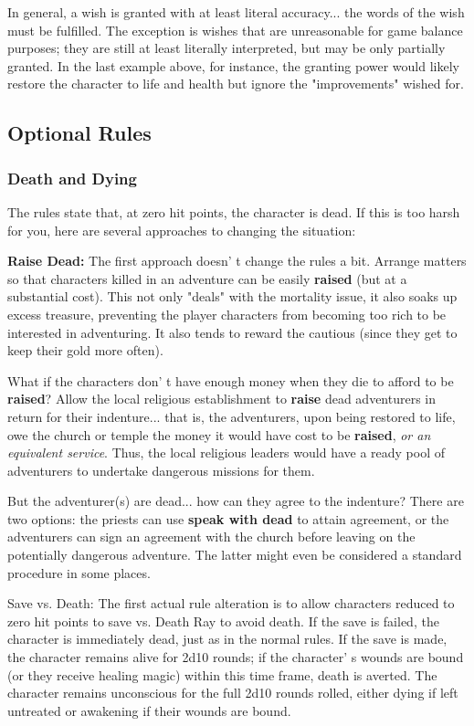 \documentclass[a4paper,twoside,openany,10pt]{book}
\begin{document}
\begin{multicols}{2}
In general, a wish is granted with at least literal accuracy... the words of the wish must be fulfilled. The exception is wishes that are unreasonable for game balance purposes; they are still at least literally interpreted, but may be only partially granted. In the last example above, for instance, the granting power would likely restore the character to life and health but ignore the "improvements" wished for.


\subsection{Optional Rules}\label{optional-rules}

\subsubsection{Death and Dying}\label{death-and-dying}

The rules state that, at zero hit points, the character is dead. If this is too harsh for you, here are several approaches to changing the situation:

\textbf{Raise Dead:} The first approach doesn' t change the rules a bit. Arrange matters so that characters killed in an adventure can be easily \textbf{raised} (but at a substantial cost). This not only "deals" with the mortality issue, it also soaks up excess treasure, preventing the player characters from becoming too rich to be interested in adventuring. It also tends to reward the cautious (since they get to keep their gold more often).

What if the characters don' t have enough money when they die to afford to be \textbf{raised}? Allow the local religious establishment to \textbf{raise} dead adventurers in return for their indenture... that is, the adventurers, upon being restored to life, owe the church or temple the money it would have cost to be \textbf{raised}, \emph{or an equivalent service}. Thus, the local religious leaders would have a ready pool of adventurers to undertake dangerous missions for them.

But the adventurer(s) are dead... how can they agree to the indenture? There are two options: the priests can use \textbf{speak with dead} to attain agreement, or the adventurers can sign an agreement with the church before leaving on the potentially dangerous adventure. The latter might even be considered a standard procedure in some places.

Save vs. Death: The first actual rule alteration is to allow characters reduced to zero hit points to save vs. Death Ray to avoid death. If the save is failed, the character is immediately dead, just as in the normal rules. If the save is made, the character remains alive for 2d10 rounds; if the character' s wounds are bound (or they receive healing magic) within this time frame, death is averted. The character remains unconscious for the full 2d10 rounds rolled, either dying if left untreated or awakening if their wounds are bound.


\end{multicols}
\end{document}
